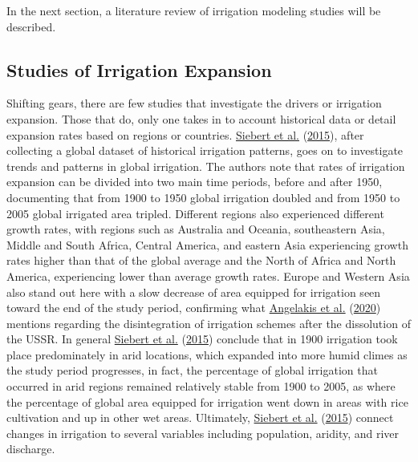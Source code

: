 \documentclass[12pt,twoside]{reedthesis}
\begin{document}
\medskip

In the next section, a literature review of irrigation modeling studies will be described.

\hypertarget{irrmodslit}{%
\subsection{Studies of Irrigation Expansion}\label{irrmodslit}}

Shifting gears, there are few studies that investigate the drivers or irrigation expansion. Those that do, only one takes in to account historical data or detail expansion rates based on regions or countries. \protect\hyperlink{ref-siebertGlobalDataSet2015}{Siebert et al.} (\protect\hyperlink{ref-siebertGlobalDataSet2015}{2015}), after collecting a global dataset of historical irrigation patterns, goes on to investigate trends and patterns in global irrigation. The authors note that rates of irrigation expansion can be divided into two main time periods, before and after 1950, documenting that from 1900 to 1950 global irrigation doubled and from 1950 to 2005 global irrigated area tripled. Different regions also experienced different growth rates, with regions such as Australia and Oceania, southeastern Asia, Middle and South Africa, Central America, and eastern Asia experiencing growth rates higher than that of the global average and the North of Africa and North America, experiencing lower than average growth rates. Europe and Western Asia also stand out here with a slow decrease of area equipped for irrigation seen toward the end of the study period, confirming what \protect\hyperlink{ref-angelakisIrrigationWorldAgricultural2020}{Angelakis et al.} (\protect\hyperlink{ref-angelakisIrrigationWorldAgricultural2020}{2020}) mentions regarding the disintegration of irrigation schemes after the dissolution of the USSR. In general \protect\hyperlink{ref-siebertGlobalDataSet2015}{Siebert et al.} (\protect\hyperlink{ref-siebertGlobalDataSet2015}{2015}) conclude that in 1900 irrigation took place predominately in arid locations, which expanded into more humid climes as the study period progresses, in fact, the percentage of global irrigation that occurred in arid regions remained relatively stable from 1900 to 2005, as where the percentage of global area equipped for irrigation went down in areas with rice cultivation and up in other wet areas. Ultimately, \protect\hyperlink{ref-siebertGlobalDataSet2015}{Siebert et al.} (\protect\hyperlink{ref-siebertGlobalDataSet2015}{2015}) connect changes in irrigation to several variables including population, aridity, and river discharge.
\end{document}
